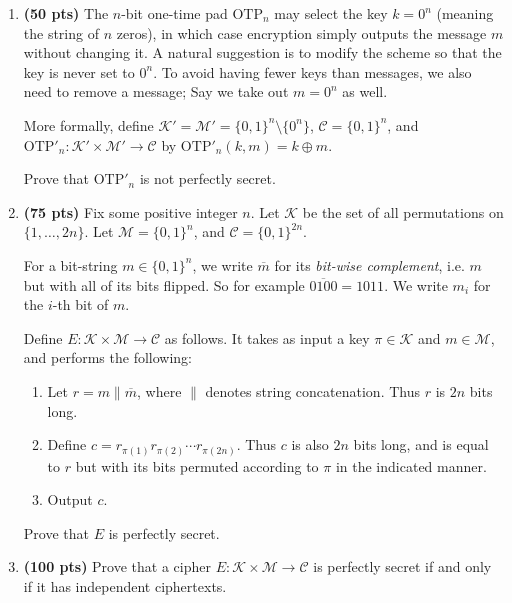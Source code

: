 \documentclass[11pt]{article}
\newcommand{\otp}{\mathrm{OTP}}
\newcommand{\msgs}{\mathcal{M}}
\newcommand{\ctxts}{\mathcal{C}}
\newcommand{\points}[1]{\textbf{({#1} pts)}}
\newcommand{\keys}{\mathcal{K}}
\newcommand{\bits}{\{0,1\}}
\begin{document}
\begin{enumerate}

\item \points{50} The $n$-bit one-time pad $\otp_n$ may select the key
        $k=0^n$ (meaning the string of $n$ zeros), in which case encryption
        simply outputs the message $m$ without changing it.  A natural
        suggestion is to modify the scheme so that the key is never set to
        $0^n$. To avoid having fewer keys than messages, we also need to remove
        a message; Say we take out $m=0^n$ as well.

        More formally, define $\keys' = \msgs' = \bits^n\setminus\{0^n\}$,
        $\ctxts = \bits^n$, and $\otp'_n:\keys' \times \msgs' \to \ctxts$ by
        $\otp'_n(k,m) = k\oplus m$.

        Prove that $\otp'_n$ is not perfectly secret. 

\item \points{75} Fix some positive integer $n$.  Let $\keys$ be the set of
        all permutations on $\{1,\ldots,2n\}$.  Let $\msgs = \bits^n$, and
        $\ctxts = \bits^{2n}$. 

        For a bit-string $m\in\bits^n$, we write $\overline{m}$ for its
        \emph{bit-wise complement}, i.e. $m$ but with all of its bits flipped.
        So for example $\overline{0100} = 1011$.  We write $m_i$ for the $i$-th
        bit of $m$.

        Define $E:\keys\times\msgs\to\ctxts$ as follows. It takes as
        input a key $\pi\in\keys$ and $m\in\msgs$, and performs the following:
        \begin{enumerate}
            \item Let $r = m \| \overline{m}$, where $\|$ denotes string
                concatenation. Thus $r$ is $2n$ bits long.
            \item Define $c = r_{\pi(1)} r_{\pi(2)} \cdots r_{\pi(2n)}$. 
                Thus $c$ is also $2n$ bits long, and is equal to $r$ but
                with its bits permuted according to $\pi$ in the indicated
                manner.
            \item Output $c$.
        \end{enumerate}
        Prove that $E$ is perfectly secret. 

\item \points{100} Prove that a cipher $E:\keys\times\msgs\to\ctxts$ is
        perfectly secret if and only if it has independent ciphertexts.


\end{enumerate}
\end{document}
